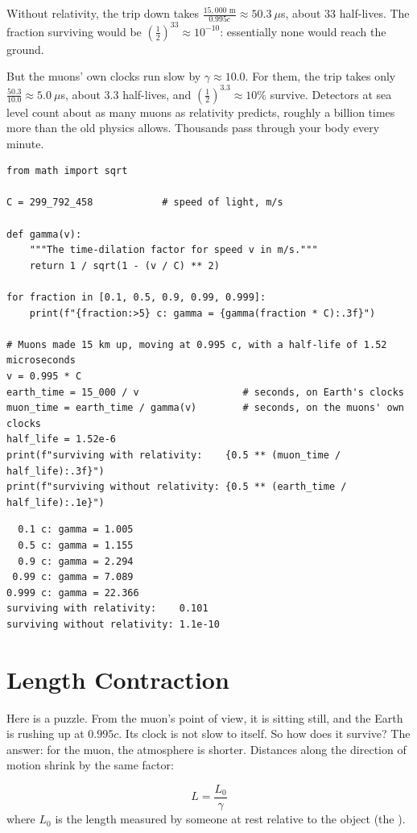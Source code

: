 Without relativity, the trip down takes $\frac{15{,}000 \text{ m}}{0.995c} \approx 50.3\ \mu$s,
about 33 half-lives. The fraction surviving would be
$\left(\frac{1}{2}\right)^{33} \approx 10^{-10}$: essentially none would reach the ground.

But the muons' own clocks run slow by $\gamma \approx 10.0$. For them, the trip takes only
$\frac{50.3}{10.0} \approx 5.0\ \mu$s, about 3.3 half-lives, and $\left(\frac{1}{2}\right)^{3.3} \approx 10\%$
survive. Detectors at sea level count about as many muons as relativity predicts, roughly a
billion times more than the old physics allows. Thousands pass through your body every minute.

\begin{verbatim}
from math import sqrt

C = 299_792_458            # speed of light, m/s

def gamma(v):
    """The time-dilation factor for speed v in m/s."""
    return 1 / sqrt(1 - (v / C) ** 2)

for fraction in [0.1, 0.5, 0.9, 0.99, 0.999]:
    print(f"{fraction:>5} c: gamma = {gamma(fraction * C):.3f}")

# Muons made 15 km up, moving at 0.995 c, with a half-life of 1.52 microseconds
v = 0.995 * C
earth_time = 15_000 / v                  # seconds, on Earth's clocks
muon_time = earth_time / gamma(v)        # seconds, on the muons' own clocks
half_life = 1.52e-6
print(f"surviving with relativity:    {0.5 ** (muon_time / half_life):.3f}")
print(f"surviving without relativity: {0.5 ** (earth_time / half_life):.1e}")
\end{verbatim}
\begin{verbatim}
  0.1 c: gamma = 1.005
  0.5 c: gamma = 1.155
  0.9 c: gamma = 2.294
 0.99 c: gamma = 7.089
0.999 c: gamma = 22.366
surviving with relativity:    0.101
surviving without relativity: 1.1e-10
\end{verbatim}

\section{Length Contraction}
Here is a puzzle. From the muon's point of view, it is sitting still, and the Earth is rushing up
at $0.995c$. Its clock is not slow to itself. So how does it survive? The answer: for the muon, the
atmosphere is shorter. Distances along the direction of motion shrink by the same factor:

\begin{mdframed}[style = important, frametitle = {Length Contraction}]
$$L = \frac{L_0}{\gamma}$$
where $L_0$ is the length measured by someone at rest relative to the object (the ).
\end{mdframed}

